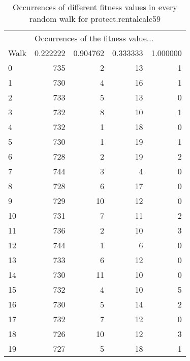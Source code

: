 \begin{table}[h]
	\centering
	\caption{Occurrences of different fitness values in every random walk for protect.rentalcalc59}
	\label{59levels}
	\begin{tabular}{lrrrr}
		\toprule
		& \multicolumn{4}{l}{Occurrences of the fitness value...}\\
		Walk & 0.222222 & 0.904762 & 0.333333 & 1.000000 \\
		\midrule
		0 & 735 & 2 & 13 & 1 \\
		1 & 730 & 4 & 16 & 1 \\
		2 & 733 & 5 & 13 & 0 \\
		3 & 732 & 8 & 10 & 1 \\
		4 & 732 & 1 & 18 & 0 \\
		5 & 730 & 1 & 19 & 1 \\
		6 & 728 & 2 & 19 & 2 \\
		7 & 744 & 3 & 4 & 0 \\
		8 & 728 & 6 & 17 & 0 \\
		9 & 729 & 10 & 12 & 0 \\
		10 & 731 & 7 & 11 & 2 \\
		11 & 736 & 2 & 10 & 3 \\
		12 & 744 & 1 & 6 & 0 \\
		13 & 733 & 6 & 12 & 0 \\
		14 & 730 & 11 & 10 & 0 \\
		15 & 732 & 4 & 10 & 5 \\
		16 & 730 & 5 & 14 & 2 \\
		17 & 732 & 7 & 12 & 0 \\
		18 & 726 & 10 & 12 & 3 \\
		19 & 727 & 5 & 18 & 1 \\
		\bottomrule
	\end{tabular}
\end{table}

